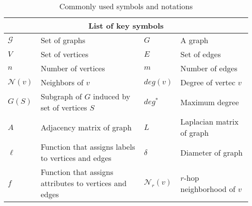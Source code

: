 \documentclass[twoside,11pt]{article}
\begin{document}
\begin{table}[t]
  \centering
  \footnotesize
  \def\arraystretch{1.1}
  \begin{tabular}{llll} \hline
    \multicolumn{4}{c}{\textbf{List of key symbols}} \\ \hline
    $\mathcal{G}$ & Set of graphs & $G$ & A graph \\
    $V$ & Set of vertices & $E$ & Set of edges \\
    $n$ & Number of vertices & $m$ & Number of edges \\
    $\mathcal{N}(v)$ & Neighbors of $v$ & $deg(v)$ & Degree of vertec $v$ \\
    $G(S)$ & Subgraph of $G$ induced by set of vertices $S$ & $deg^*$ & Maximum degree \\
    $A$ & Adjacency matrix of graph & $L$ & Laplacian matrix of graph \\
    $\ell$ & Function that assigns labels to vertices and edges & $\delta$ & Diameter of graph \\ 
    $f$ & Function that assigns attributes to vertices and edges & $\mathcal{N}_r(v)$ & $r$-hop neighborhood of $v$ \\ \hline
  \end{tabular}
  \caption{Commonly used symbols and notations}
  \label{tab:symbols}
\end{table}
\end{document}
